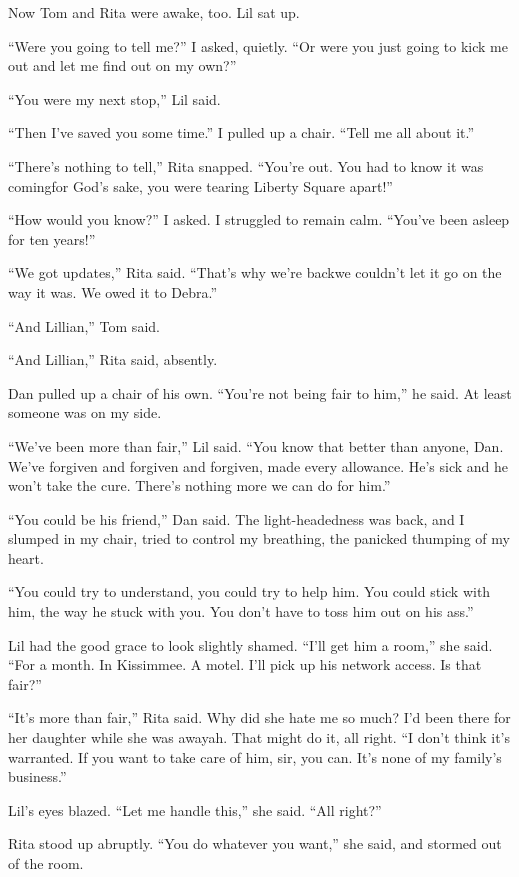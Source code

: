Now Tom and Rita were awake, too. Lil sat up.

“Were you going to tell me?” I asked, quietly. “Or were you just
going to kick me out and let me find out on my own?”

“You were my next stop,” Lil said.

“Then I've saved you some time.” I pulled up a chair. “Tell me all
about it.”

“There's nothing to tell,” Rita snapped. “You're out. You had to
know it was coming{\dash}for God's sake, you were tearing Liberty Square
apart!”

“How would you know?” I asked. I struggled to remain calm. “You've
been asleep for ten years!”

“We got updates,” Rita said. “That's why we're back{\dash}we couldn't let
it go on the way it was. We owed it to Debra.”

“And Lillian,” Tom said.

“And Lillian,” Rita said, absently.

Dan pulled up a chair of his own. “You're not being fair to him,”
he said. At least someone was on my side.

“We've been more than fair,” Lil said. “You know that better than
anyone, Dan. We've forgiven and forgiven and forgiven, made every
allowance. He's sick and he won't take the cure. There's nothing
more we can do for him.”

“You could be his friend,” Dan said. The light-headedness was back,
and I slumped in my chair, tried to control my breathing, the
panicked thumping of my heart.

“You could try to understand, you could try to help him. You could
stick with him, the way he stuck with you. You don't have to toss
him out on his ass.”

Lil had the good grace to look slightly shamed. “I'll get him a
room,” she said. “For a month. In Kissimmee. A motel. I'll pick up
his network access. Is that fair?”

“It's more than fair,” Rita said. Why did she hate me so much? I'd
been there for her daughter while she was away{\dash}ah. That might do
it, all right. “I don't think it's warranted. If you want to take
care of him, sir, you can. It's none of my family's business.”

Lil's eyes blazed. “Let me handle this,” she said. “All right?”

Rita stood up abruptly. “You do whatever you want,” she said, and
stormed out of the room.

